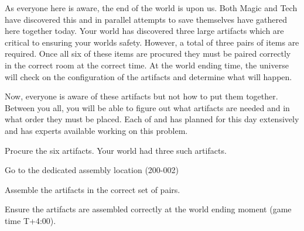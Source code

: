 \documentclass[green]{guildcamp3}
\begin{document}
\name{\gSaveWorld{}}



As everyone here is aware, the end of the world is upon us. Both Magic and Tech have discovered this and in parallel attempts to save themselves have gathered here together today. Your world has discovered three large artifacts which are critical to ensuring your worlds safety. However, a total of three pairs of items are required. Once all six of these items are procured they must be paired correctly in the correct room at the correct time. At the world ending time, the universe will check on the configuration of the artifacts and determine what will happen. 

Now, everyone is aware of these artifacts but not how to put them together. Between you all, you will be able to figure out what artifacts are needed and in what order they must be placed. Each of \bTechWorld{} and \bMagicWorld{} has planned for this day extensively and has experts available working on this problem. 



\begin{enum}[Directions]
  \item Procure the six artifacts. Your world had three such artifacts.  
  \item Go to the dedicated assembly location (200-002)
  \item Assemble the artifacts in the correct set of pairs.
  \item Ensure the artifacts are assembled correctly at the world ending moment (game time T+4:00). 
\end{enum}
\end{document}
